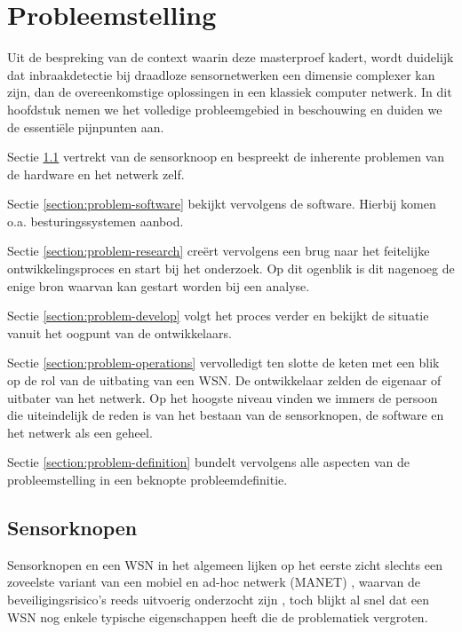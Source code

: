 
\chapter{Probleemstelling}
\label{chapter:probleemstelling}

Uit de bespreking van de context waarin deze masterproef kadert, wordt
duidelijk dat inbraakdetectie bij draadloze sensornetwerken een dimensie
complexer kan zijn, dan de overeenkomstige oplossingen in een klassiek computer
netwerk. In dit hoofdstuk nemen we het volledige probleemgebied in beschouwing
en duiden we de essenti\"ele pijnpunten aan.

Sectie \ref{section:problem-hardware} vertrekt van de sensorknoop en bespreekt
de inherente problemen van de hardware en het netwerk zelf.

Sectie \ref{section:problem-software} bekijkt vervolgens de software. Hierbij
komen o.a. besturingssystemen aanbod.

Sectie \ref{section:problem-research} cre\"ert vervolgens een brug naar het
feitelijke ontwikkelingsproces en start bij het onderzoek. Op dit ogenblik is
dit nagenoeg de enige bron waarvan kan gestart worden bij een analyse.

Sectie \ref{section:problem-develop} volgt het proces verder en bekijkt de
situatie vanuit het oogpunt van de ontwikkelaars.

Sectie \ref{section:problem-operations} vervolledigt ten slotte de keten met
een blik op de rol van de uitbating van een WSN. De ontwikkelaar zelden de
eigenaar of uitbater van het netwerk. Op het hoogste niveau vinden we immers de
persoon die uiteindelijk de reden is van het bestaan van de sensorknopen, de
software en het netwerk als een geheel.

Sectie \ref{section:problem-definition} bundelt vervolgens alle aspecten van de
probleemstelling in een beknopte probleemdefinitie.

\section{Sensorknopen}
\label{section:problem-hardware}

Sensorknopen en een WSN in het algemeen lijken op het eerste zicht slechts een
zoveelste variant van een mobiel en ad-hoc netwerk (MANET)
\citep{garg2010mobile}, waarvan de beveiligingsrisico's reeds uitvoerig
onderzocht zijn \citep{djenouri2005survey, zhang2000intrusion,
kachirski2003effective}, toch blijkt al snel dat een WSN nog enkele typische
eigenschappen heeft die de problematiek vergroten.

